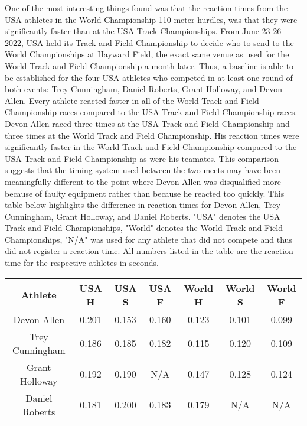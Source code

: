 \documentclass[12pt, letterpaper, titlepage]{article}
\begin{document}
One of the most interesting things found was that the reaction times from the USA
athletes in the World Championship 110 meter hurdles, was that they were significantly
faster than at the USA Track Championships.  From June 23-26 2022, USA held its Track
and Field Championship to decide who to send to the World Championships at Hayward 
Field, the exact same venue as used for the World Track and Field Championship a month 
later.  Thus, a baseline is able to be established for the four USA athletes who 
competed in at least one round of both events: Trey Cunningham, Daniel Roberts, 
Grant Holloway, and Devon Allen. Every athlete reacted faster in all of the World 
Track and Field Championship races compared to the USA Track and Field 
Championship races. Devon Allen raced three times at the USA Track and
Field Championship and three times at the World Track and Field  Championship. 
His reaction times were significantly faster in the World Track and
Field Championship compared to the USA Track and Field Championship as were his
teamates.  This comparison suggests that the timing system used between the two
meets may have been meaningfully different to the point where Devon Allen was
disqualified more because of faulty equipment rather than because he reacted
too quickly.  This table below highlights the difference in reaction times for
Devon Allen, Trey Cunningham, Grant Holloway, and Daniel Roberts. "USA" denotes
the USA Track and Field Championships, "World" denotes the World Track and Field
Championships, "N/A" was used for any athlete that did not compete and thus
did not register a reaction time.  All numbers listed in the table are the reaction
time for the respective athletes in seconds. 


\begin{center}
  \begin{tabular}{||c | c c c | c c c||} 
   \hline
   Athlete & USA H & USA S & USA F & World H & World S & World F \\ [0.5ex] 
   \hline\hline
   Devon Allen & 0.201 & 0.153 & 0.160 & 0.123 & 0.101 & 0.099 \\ 
   \hline
   Trey Cunningham & 0.186 & 0.185 & 0.182 & 0.115 & 0.120 & 0.109 \\
   \hline
   Grant Holloway & 0.192 & 0.190 & N/A & 0.147 & 0.128 & 0.124 \\
   \hline
   Daniel Roberts & 0.181 & 0.200 & 0.183 & 0.179 & N/A & N/A \\ [0.5ex]
   \hline
  \end{tabular}
  \end{center}
\end{document}
